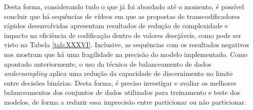 Desta forma, considerando tudo o que já foi abordado até o momento, é possível concluir que há sequências de vídeos em que as propostas de transcodificadores rápidos desenvolvidas apresentam resultados de redução de complexidade e impacto na eficiência de codificação dentro de valores desejáveis, como pode ser visto na Tabela \ref{tab:XXXVI}. Inclusive, as sequências com os resultados negativos nos mostram que há uma fragilidade na precisão do modelo implementado. Como apontado anteriormente, o uso da técnica de balanceamento de dados \textit{undersampling} aplica uma redução da capacidade de discernimento no limite entre decisões binárias. Desta forma, é preciso investigar e avaliar os melhores balanceamentos dos conjuntos de dados utilizados para treinamento e teste dos modelos, de forma a reduzir essa imprecisão entre particionar ou não particionar.

